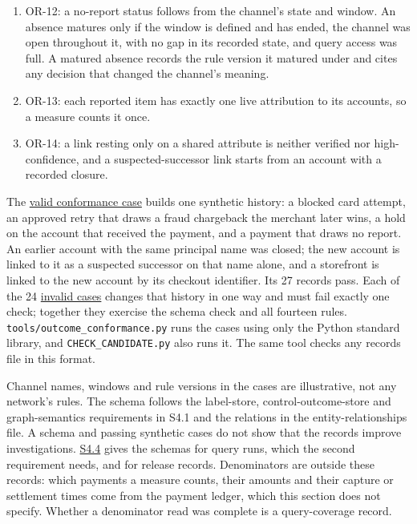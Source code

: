 \documentclass[
  11pt,
]{article}
\begin{document}
\begin{enumerate}
\item
  \mbox{OR-12}: a no-report status follows from the channel's state and
  window. An absence matures only if the window is defined and has
  ended, the channel was open throughout it, with no gap in its recorded
  state, and query access was full. A matured absence records the rule
  version it matured under and cites any decision that changed the
  channel's meaning.
\item
  \mbox{OR-13}: each reported item has exactly one live attribution to
  its accounts, so a measure counts it once.
\item
  \mbox{OR-14}: a link resting only on a shared attribute is neither
  verified nor high-confidence, and a suspected-successor link starts
  from an account with a recorded closure.
\end{enumerate}

The \href{SUPPLEMENT/S4_OUTCOME_RECORDS/conformance_valid.json}{valid
conformance case} builds one synthetic history: a blocked card attempt,
an approved retry that draws a fraud chargeback the merchant later wins,
a hold on the account that received the payment, and a payment that
draws no report. An earlier account with the same principal name was
closed; the new account is linked to it as a suspected successor on that
name alone, and a storefront is linked to the new account by its
checkout identifier. Its 27 records pass. Each of the 24
\href{SUPPLEMENT/S4_OUTCOME_RECORDS/conformance_invalid.json}{invalid
cases} changes that history in one way and must fail exactly one check;
together they exercise the schema check and all fourteen rules.
\texttt{tools/outcome\_conformance.py} runs the cases using only the
Python standard library, and \texttt{CHECK\_CANDIDATE.py} also runs it.
The same tool checks any records file in this format.

Channel names, windows and rule versions in the cases are illustrative,
not any network's rules. The schema follows the label-store,
control-outcome-store and graph-semantics requirements in S4.1 and the
relations in the entity-relationships file. A schema and passing
synthetic cases do not show that the records improve investigations.
\protect\hyperlink{s44-field-level-schemas-for-query-runs-and-release}{S4.4}
gives the schemas for query runs, which the second requirement needs,
and for release records. Denominators are outside these records: which
payments a measure counts, their amounts and their capture or settlement
times come from the payment ledger, which this section does not specify.
Whether a denominator read was complete is a query-coverage record.
\end{document}
